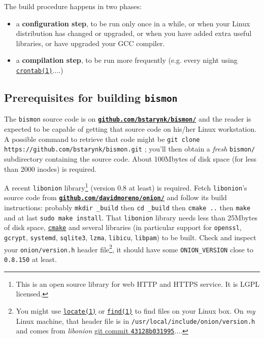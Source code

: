 \begin{appendices}
\medskip

The build procedure happens in two phases:

\begin{itemize}

\item a \textbf{configuration step}, to be run only once in a while,
  or when your Linux distribution has changed or upgraded, or when you
  have added extra useful libraries, or have upgraded your GCC
  compiler.

\item a \textbf{compilation step}, to be run more frequently
  (e.g. every night using
  \href{https://man7.org/linux/man-pages/man1/crontab.1.html}{\texttt{crontab(1)}}....)

\end{itemize}

\medskip

\subsection{Prerequisites for building \texttt{bismon}}
\label{subsec:prereq-bismon}

The \texttt{bismon} source code is on
\href{https://github.com/bstarynk/bismon/}{\texttt{\textbf{github.com/bstarynk/bismon/}}}
and the reader is expected to be capable of getting that source code
on his/her Linux workstation. A possible command to retrieve that code
might be \texttt{git clone https://github.com/bstarynk/bismon.git} ;
you'll then obtain a \emph{fresh} \texttt{bismon/} subdirectory
containing the source code. About 100Mbytes of disk space (for less
than 2000 inodes) is required.

A recent \texttt{libonion} library\footnote{This is an open source
  library for web HTTP and HTTPS service. It is LGPL licensed.}
(version 0.8 at least) is required. Fetch \texttt{libonion}'s source
code from
\href{https://github.com/davidmoreno/onion}{\texttt{\textbf{github.com/davidmoreno/onion/}}}
and follow its build instructions: probably \texttt{mkdir \_build} then
\texttt{cd \_build} then \texttt{cmake ..} then \texttt{make} and at
last \texttt{sudo make install}. That \texttt{libonion} library needs
less than 25Mbytes of disk space,
\href{https://cmake.org}{\texttt{cmake}} and several libraries (in
particular support for \texttt{openssl}, \texttt{gcrypt},
\texttt{systemd}, \texttt{sqlite3}, \texttt{lzma}, \texttt{libicu},
\texttt{libpam}) to be built. Check and inspect your
\texttt{onion/version.h} header file\footnote{You might use
  \href{https://man7.org/linux/man-pages/man1/locate.1.html}{\texttt{locate(1)}}
  or
  \href{https://man7.org/linux/man-pages/man1/find.1.html}{\texttt{find(1)}}
  to find files on your Linux box. On \emph{my} Linux machine, that
  header file is in \texttt{/usr/local/include/onion/version.h} and
  comes from \emph{libonion}
  \href{https://github.com/davidmoreno/onion/commit/43128b03199518d4878074c311ff71ff0018aea8}{git
    commit \texttt{43128b031995}}....}, it should have some
\texttt{ONION\_VERSION} close to \texttt{0.8.150} at least.


\end{appendices}
